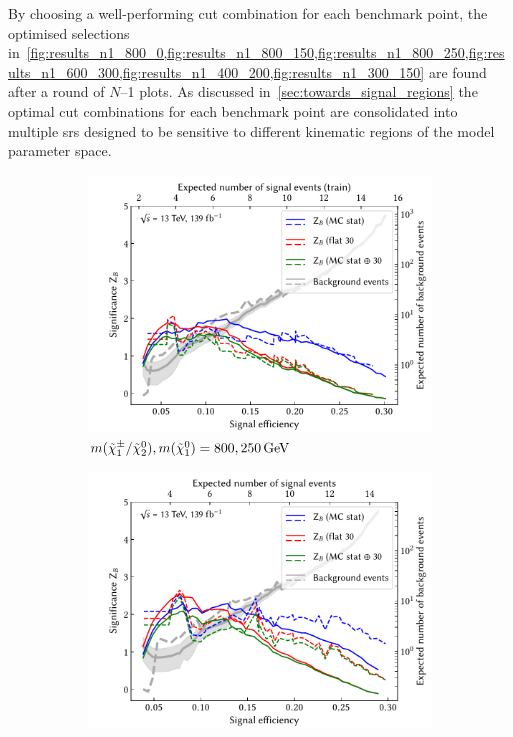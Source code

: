 By choosing a well-performing cut combination for each benchmark point, the optimised selections in~\cref{fig:results_n1_800_0,fig:results_n1_800_150,fig:results_n1_800_250,fig:results_n1_600_300,fig:results_n1_400_200,fig:results_n1_300_150} are found after a round of $N$--1 plots. As discussed in~\cref{sec:towards_signal_regions} the optimal cut combinations for each benchmark point are consolidated into multiple \glspl{sr} designed to be sensitive to different kinematic regions of the model parameter space. 

\begin{figure}[hb]
	\centering
	\begin{subfigure}[b]{0.5\linewidth}
		\centering\includegraphics[width=1.0\textwidth]{N-1_cut_scan/z_vs_effs_800_250.pdf}
		\caption{$m(\charg/\neutr), m(\lsp) =  800, \SI{250}{\GeV}$}
	\end{subfigure}\hfill
	\begin{subfigure}[b]{0.5\linewidth}
		\centering\includegraphics[width=1.0\textwidth]{N-1_cut_scan/z_vs_effs_800_150.pdf}

\end{subfigure}
\end{figure}
